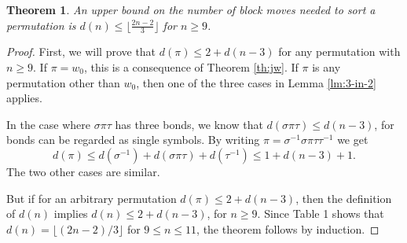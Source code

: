 \documentclass[11pt]{amsart} %
\newtheorem{theorem}{Theorem}[section]
\begin{document}
\begin{theorem}\label{th:2/3}
An upper bound on the number of block moves needed to sort a
permutation is $d(n) \le \lfloor \frac{2n-2}{3} \rfloor$ for $n\ge 9$.
\end{theorem}
\begin{proof}
First, we will prove that $d(\pi) \leq  2 + d(n-3)$ for any 
permutation with $n \ge 9$. If $\pi=w_0$, this is a consequence
of Theorem \ref{th:jw}.
If $\pi$ is any permutation other than $w_0$, then
one of the three cases in Lemma \ref{lm:3-in-2} applies.

In the case where $\sigma \pi \tau$ has three bonds, we know that 
$d( \sigma \pi \tau )\leq d(n-3)$, for bonds can be regarded as
single symbols. By writing $\pi=\sigma^{-1}\sigma\pi\tau\tau^{-1}$ we get
$$ d( \pi )\le d( \sigma^{-1})+d(\sigma\pi\tau)+d(\tau^{-1}) 
                            \leq 1 + d( n-3) + 1.$$
The two other cases are similar.

But if for an arbitrary permutation $d(\pi) \leq  2 + d(n-3)$,
then the definition of $d(n)$ implies
$ d(n)  \leq 2 + d( n-3)$, for $n \ge 9.$
Since Table 1 shows that $d(n)=\lfloor (2n-2)/3 \rfloor$ for $9\leq n \leq 11$,
the theorem follows by induction.
\end{proof}
\end{document}
